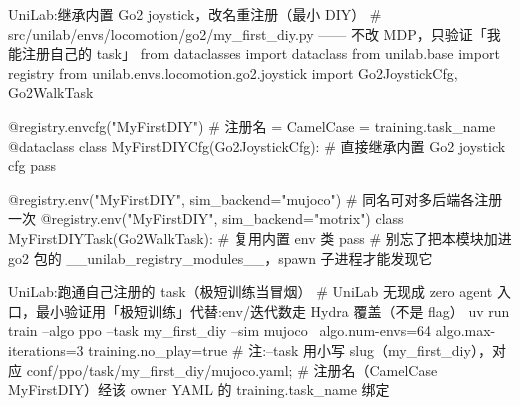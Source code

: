 \begin{codebox}[Python]{UniLab:继承内置 Go2 joystick，改名重注册（最小 DIY）}
# src/unilab/envs/locomotion/go2/my_first_diy.py —— 不改 MDP，只验证「我能注册自己的 task」
from dataclasses import dataclass
from unilab.base import registry
from unilab.envs.locomotion.go2.joystick import Go2JoystickCfg, Go2WalkTask

@registry.envcfg("MyFirstDIY")                       # 注册名 = CamelCase = training.task_name
@dataclass
class MyFirstDIYCfg(Go2JoystickCfg):                 # 直接继承内置 Go2 joystick cfg
    pass

@registry.env("MyFirstDIY", sim_backend="mujoco")    # 同名可对多后端各注册一次
@registry.env("MyFirstDIY", sim_backend="motrix")
class MyFirstDIYTask(Go2WalkTask):                    # 复用内置 env 类
    pass
# 别忘了把本模块加进 go2 包的 __unilab_registry_modules__，spawn 子进程才能发现它
\end{codebox}

\begin{codebox}[bash]{UniLab:跑通自己注册的 task（极短训练当冒烟）}
# UniLab 无现成 zero agent 入口，最小验证用「极短训练」代替:env/迭代数走 Hydra 覆盖（不是 flag）
uv run train --algo ppo --task my_first_diy --sim mujoco \
    algo.num-envs=64 algo.max-iterations=3 training.no_play=true
# 注:--task 用小写 slug（my_first_diy），对应 conf/ppo/task/my_first_diy/mujoco.yaml;
#     注册名（CamelCase MyFirstDIY）经该 owner YAML 的 training.task_name 绑定
\end{codebox}


